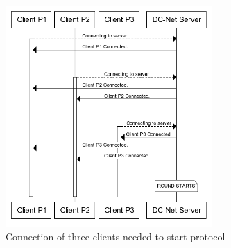 \begin{figure}[H]
    \centering
    \includegraphics[width=0.7\textwidth]{Images/Design/clientsConnection.png}
    \caption{Connection of three clients needed to start protocol}
    \label{fig:clientsConnection}
\end{figure}

